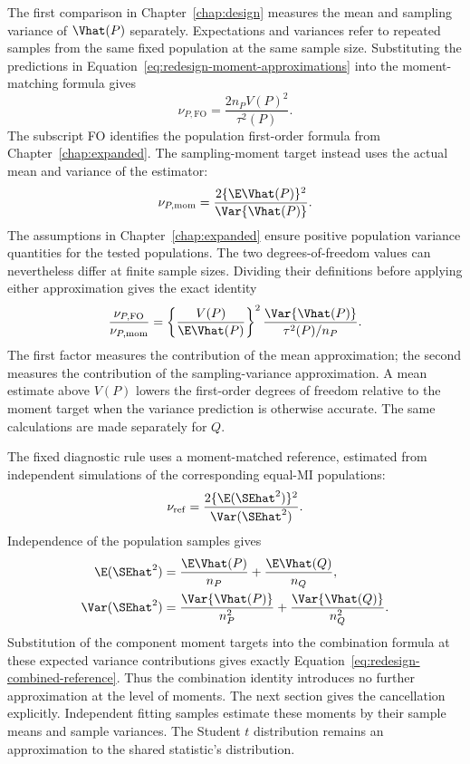 The first comparison in Chapter~\ref{chap:design} measures the mean and
sampling variance of \(\Vhat(P)\) separately. Expectations and variances
refer to repeated samples from the same fixed population at the same
sample size. Substituting the predictions in
Equation~\eqref{eq:redesign-moment-approximations} into the moment-matching
formula gives
\begin{equation}
 \nu_{P,\mathrm{FO}}=\frac{2n_PV(P)^2}{\tau^2(P)}.
 \label{eq:redesign-first-order-df}
\end{equation}
The subscript FO identifies the population first-order formula from
Chapter~\ref{chap:expanded}. The sampling-moment target instead uses
the actual mean and variance of the estimator:
\begin{equation}
 \nu_{P,\mathrm{mom}}
 =\frac{2\{\E\Vhat(P)\}^2}{\Var\{\Vhat(P)\}}.
 \label{eq:redesign-moment-df}
\end{equation}
The assumptions in Chapter~\ref{chap:expanded} ensure positive population
variance quantities for the tested populations. The two degrees-of-freedom
values can nevertheless differ at finite sample sizes. Dividing their
definitions before applying either approximation gives the exact identity
\begin{equation}
 \frac{\nu_{P,\mathrm{FO}}}{\nu_{P,\mathrm{mom}}}
 =\left\{\frac{V(P)}{\E\Vhat(P)}\right\}^{2}
   \frac{\Var\{\Vhat(P)\}}{\tau^2(P)/n_P}.
 \label{eq:redesign-df-decomposition}
\end{equation}
The first factor measures the contribution of the mean approximation;
the second measures the contribution of the sampling-variance
approximation. A mean estimate above \(V(P)\) lowers the first-order
degrees of freedom relative to the moment target when the variance
prediction is otherwise accurate. The same calculations are made
separately for \(Q\).

The fixed diagnostic rule uses a moment-matched reference, estimated from
independent simulations of the corresponding equal-MI populations:
\begin{equation}
 \nu_{\mathrm{ref}}=
 \frac{2\{\E(\SEhat^2)\}^{2}}{\Var(\SEhat^2)}.
 \label{eq:redesign-combined-reference}
\end{equation}
Independence of the population samples gives
\begin{align}
 \E(\SEhat^2)&=\frac{\E\Vhat(P)}{n_P}+\frac{\E\Vhat(Q)}{n_Q},\\
 \Var(\SEhat^2)&=\frac{\Var\{\Vhat(P)\}}{n_P^2}
                  +\frac{\Var\{\Vhat(Q)\}}{n_Q^2}.
 \label{eq:redesign-reference-variance}
\end{align}
Substitution of the component moment targets into the combination formula
at these expected variance contributions gives exactly
Equation~\eqref{eq:redesign-combined-reference}. Thus the combination
identity introduces no further approximation at the level of moments.
The next section gives the cancellation explicitly. Independent fitting samples estimate these moments by their
sample means and sample variances. The Student \(t\) distribution remains
an approximation to the shared statistic's distribution.


